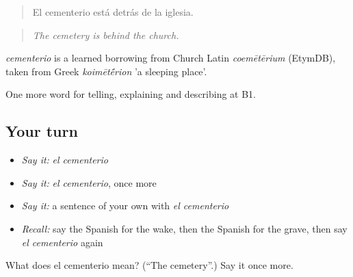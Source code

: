 \begin{quote}
El cementerio está detrás de la iglesia.
\end{quote}

\begin{quote}
\emph{The cemetery is behind the church.}
\end{quote}

\begin{cousinweb}
\emph{cementerio} is a learned borrowing from Church Latin \emph{coemētērium} (EtymDB), taken from Greek \emph{koimēt\'{\={e}}rion} 'a sleeping place'.
\end{cousinweb}

\begin{grammarlens}[title={What you've built}]
One more word for telling, explaining and describing at B1.
\end{grammarlens}

\subsection*{Your turn}
\begin{itemize}
\raggedright
  \item \emph{Say it:} \emph{el cementerio}
  \item \emph{Say it:} \emph{el cementerio}, once more
  \item \emph{Say it:} a sentence of your own with \emph{el cementerio}
  \item \emph{Recall:} say the Spanish for the wake, then the Spanish for the grave, then say \emph{el cementerio} again
\end{itemize}

\begin{tcolorbox}[breakable,colback=teal!4,colframe=teal!35!black,title={Before you move on}]
What does el cementerio mean? (\textquotedblleft{}The cemetery\textquotedblright{}.) Say it once more.
\end{tcolorbox}
